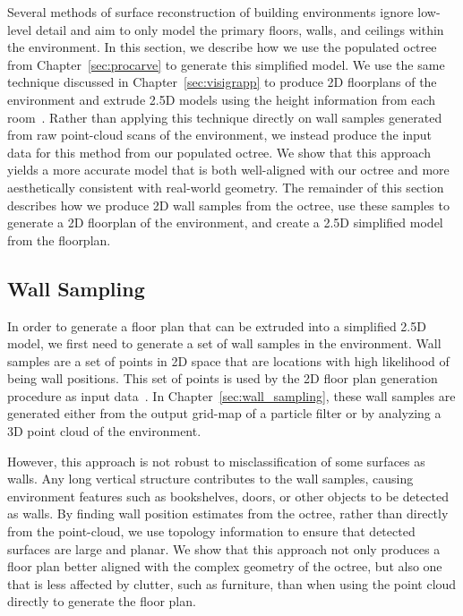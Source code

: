 \documentclass[12pt,onecolumn,oneside]{book}
\begin{document}
Several methods of surface reconstruction of building environments ignore low-level detail and aim to only model the primary floors, walls, and ceilings within the environment.  In this section, we describe how we use the populated octree from Chapter~\ref{sec:procarve} to generate this simplified model.  We use the same technique discussed in Chapter~\ref{sec:visigrapp} to produce 2D floorplans of the environment and extrude 2.5D models using the height information from each room~\cite{Turner14}.  Rather than applying this technique directly on wall samples generated from raw point-cloud scans of the environment, we instead produce the input data for this method from our populated octree.  We show that this approach yields a more accurate model that is both well-aligned with our octree and more aesthetically consistent with real-world geometry.  The remainder of this section describes how we produce 2D wall samples from the octree, use these samples to generate a 2D floorplan of the environment, and create a 2.5D simplified model from the floorplan.

\subsection{Wall Sampling}
\label{ssec:oct2dq}

In order to generate a floor plan that can be extruded into a simplified 2.5D model, we first need to generate a set of wall samples in the environment.  Wall samples are a set of points in 2D space that are locations with high likelihood of being wall positions.  This set of points is used by the 2D floor plan generation procedure as input data~\cite{Turner14}.  In Chapter~\ref{sec:wall_sampling}, these wall samples are generated either from the output grid-map of a particle filter or by analyzing a 3D point cloud of the environment.

However, this approach is not robust to misclassification of some surfaces as walls.  Any long vertical structure contributes to the wall samples, causing environment features such as bookshelves, doors, or other objects to be detected as walls.  By finding wall position estimates from the octree, rather than directly from the point-cloud, we use topology information to ensure that detected surfaces are large and planar.  We show that this approach not only produces a floor plan better aligned with the complex geometry of the octree, but also one that is less affected by clutter, such as furniture, than when using the point cloud directly to generate the floor plan.
\end{document}
